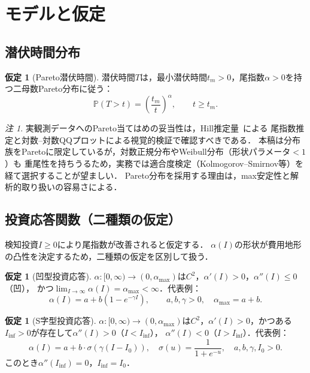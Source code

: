 \documentclass[12pt,a4paper]{article}
\theoremstyle{plain}
\theoremstyle{definition}
\newtheorem{assumption}[theorem]{仮定}
\theoremstyle{remark}
\newtheorem{remark}[theorem]{注}
\newcommand{\Prob}{\mathbb{P}}
\begin{document}
\section{モデルと仮定}
\label{sec:model}

\subsection{潜伏時間分布}

\begin{assumption}[Pareto潜伏時間]\label{ass:pareto}
潜伏時間$T$は，最小潜伏時間$t_m > 0$，尾指数$\alpha > 0$を持つ二母数Pareto分布に従う：
\begin{equation}\label{eq:pareto}
  \Prob(T > t) = \left(\frac{t_m}{t}\right)^{\alpha}, \qquad t \ge t_m.
\end{equation}
\end{assumption}

\begin{remark}
実観測データへのPareto当てはめの妥当性は，Hill推定量~\cite{hill1975simple}による
尾指数推定と対数–対数QQプロットによる視覚的検証で確認すべきである．
本稿は分布族をParetoに限定しているが，対数正規分布やWeibull分布（形状パラメータ$<1$）も
重尾性を持ちうるため，実務では適合度検定（Kolmogorov–Smirnov等）を経て選択することが望ましい．
Pareto分布を採用する理由は，max安定性と解析的取り扱いの容易さによる．
\end{remark}

\subsection{投資応答関数（二種類の仮定）}

検知投資$I \ge 0$により尾指数が改善されると仮定する．
$\alpha(I)$の形状が費用地形の凸性を決定するため，二種類の仮定を区別して扱う．

\begin{assumption}[凹型投資応答]\label{ass:alpha_concave}
$\alpha: [0,\infty) \to (0,\alpha_{\max})$は$C^2$，$\alpha'(I) > 0$，$\alpha''(I) \le 0$（凹），
かつ$\lim_{I\to\infty}\alpha(I) = \alpha_{\max} < \infty$．代表例：
\[
  \alpha(I) = a + b(1 - e^{-\gamma I}), \qquad a,b,\gamma > 0,\quad \alpha_{\max} = a+b.
\]
\end{assumption}

\begin{assumption}[S字型投資応答]\label{ass:alpha_sigmoid}
$\alpha: [0,\infty) \to (0,\alpha_{\max})$は$C^2$，$\alpha'(I) > 0$，かつある
$I_{\mathrm{inf}} > 0$が存在して$\alpha''(I) > 0$（$I < I_{\mathrm{inf}}$），
$\alpha''(I) < 0$（$I > I_{\mathrm{inf}}$）．代表例：
\[
  \alpha(I) = a + b \cdot \sigma(\gamma(I - I_0)),\quad
  \sigma(u) = \frac{1}{1+e^{-u}},\quad a,b,\gamma,I_0 > 0.
\]
このとき$\alpha''(I_{\mathrm{inf}}) = 0$，$I_{\mathrm{inf}} = I_0$．
\end{assumption}
\end{document}
